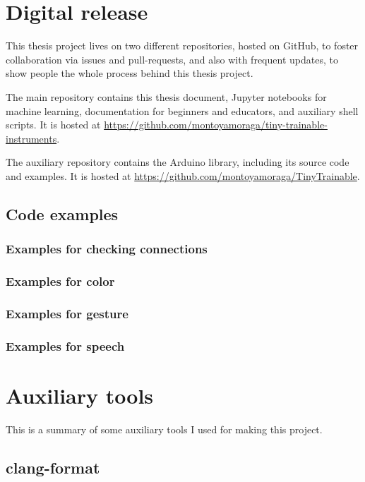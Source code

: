 \section{Digital release}

This thesis project lives on two different repositories, hosted on GitHub, to foster collaboration via \glspl{issue} and \glspl{pull-request}, and also with frequent updates, to show people the whole process behind this thesis project.

The main repository contains this thesis document, Jupyter notebooks for machine learning, documentation for beginners and educators, and auxiliary shell scripts. It is hosted at \url{https://github.com/montoyamoraga/tiny-trainable-instruments}.

The auxiliary repository contains the Arduino library, including its source code and examples. It is hosted at \url{https://github.com/montoyamoraga/TinyTrainable}.

\subsection{Code examples}

\subsubsection{Examples for checking connections}

\subsubsection{Examples for color}

\subsubsection{Examples for gesture}

\subsubsection{Examples for speech}

\section{Auxiliary tools}

This is a summary of some auxiliary tools I used for making this project.

\subsection{clang-format}

